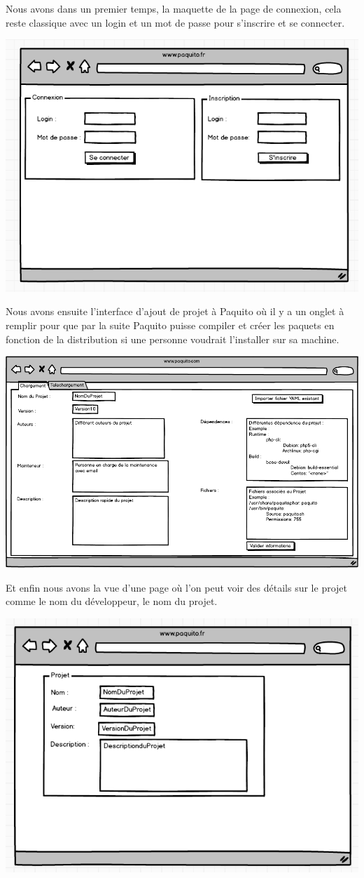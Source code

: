 \documentclass[12pt,a4paper]{article}
\begin{document}
Nous avons dans un premier temps, la maquette de la page de connexion, cela reste classique avec un login et un mot de passe pour s'inscrire et se connecter.
	
	\includegraphics[scale=0.6]{../img/connexionPaquito.png}

Nous avons ensuite l'interface d'ajout de projet à Paquito où il y a un onglet à remplir pour que par la suite Paquito puisse compiler et créer les paquets en fonction de la distribution si une personne voudrait l'installer sur sa machine.

	
	\includegraphics[scale=0.6]{../img/ajouterProjet.png}


Et enfin nous avons la vue d'une page où l'on peut voir des détails sur le projet comme le nom du développeur, le nom du projet.

	\includegraphics[scale=0.6]{../img/resumeProjet.png}

	
\end{document}
